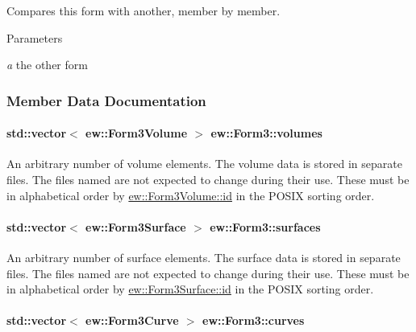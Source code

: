\label{classew_1_1Form3_a002e398fca7517dfacc077a1450190d0}
Compares this form with another, member by member. 
\begin{DoxyParams}{Parameters}
\item[{\em a}]the other form \end{DoxyParams}


\subsubsection{Member Data Documentation}
\hypertarget{classew_1_1Form3_aab5dcd7658c84512d05e095e58341fa7}{
\paragraph[{volumes}]{\setlength{\rightskip}{0pt plus 5cm}std::vector$<$ {\bf ew::Form3Volume} $>$ {\bf ew::Form3::volumes}}\hfill}
\label{classew_1_1Form3_aab5dcd7658c84512d05e095e58341fa7}
An arbitrary number of volume elements. The volume data is stored in separate files. The files named are not expected to change during their use. These must be in alphabetical order by \hyperlink{classew_1_1Form3Volume_aede415929600c673c12b8d99f600ea37}{ew::Form3Volume::id} in the POSIX sorting order. \hypertarget{classew_1_1Form3_abd4405612b484b5d9d87b643d316b020}{
\paragraph[{surfaces}]{\setlength{\rightskip}{0pt plus 5cm}std::vector$<$ {\bf ew::Form3Surface} $>$ {\bf ew::Form3::surfaces}}\hfill}
\label{classew_1_1Form3_abd4405612b484b5d9d87b643d316b020}
An arbitrary number of surface elements. The surface data is stored in separate files. The files named are not expected to change during their use. These must be in alphabetical order by \hyperlink{classew_1_1Form3Surface_aa207964ce409cd2cd7b0d4a02ad18d5a}{ew::Form3Surface::id} in the POSIX sorting order. \hypertarget{classew_1_1Form3_ab60def495fb8fea585dff2fb8c94d845}{
\paragraph[{curves}]{\setlength{\rightskip}{0pt plus 5cm}std::vector$<$ {\bf ew::Form3Curve} $>$ {\bf ew::Form3::curves}}\hfill}
